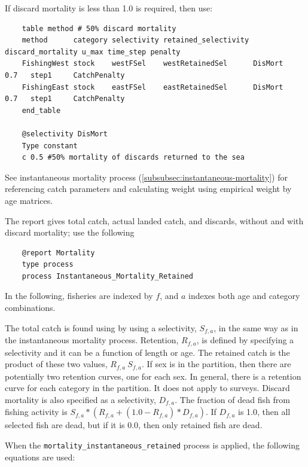 If discard mortality is less than 1.0 is required, then use:

{\small{\begin{verbatim}
    table method # 50% discard mortality
    method      category selectivity retained_selectivity discard_mortality u_max time_step penalty
    FishingWest stock    westFSel    westRetainedSel      DisMort           0.7   step1     CatchPenalty
    FishingEast stock    eastFSel    eastRetainedSel      DisMort           0.7   step1     CatchPenalty
    end_table

    @selectivity DisMort
    Type constant
    c 0.5 #50% mortality of discards returned to the sea
    \end{verbatim}}}

See instantaneous mortality process (\ref{subsubsec:instantaneous-mortality}) for referencing catch parameters and calculating weight using empirical weight by age matrices.

The report gives total catch, actual landed catch, and discards, without and with discard mortality; use the following

{\small{\begin{verbatim}
    @report Mortality
    type process
    process Instantaneous_Mortality_Retained
    \end{verbatim}}}

In the following, fisheries are indexed by $f$, and $a$ indexes both age and category combinations.

The total catch is found using by using a selectivity, $S_{f,a}$, in the same way as in the instantaneous mortality process. Retention, $R_{f,a}$, is defined by specifying a selectivity and it can be a function of length or age. The retained catch is the product of these two values, $R_{f,a} \ S_{f,a}$. If sex is in the partition, then there are potentially two retention curves, one for each sex. In general, there is a retention curve for each category in the partition. It does not apply to surveys. Discard mortality is also specified as a selectivity, $D_{f,a}$. The fraction of dead fish from fishing activity is $S_{f,a} * ( R_{f,a} + (1.0 - R_{f,a} ) * D_{f,a} )$. If $D_{f,a}$ is 1.0, then all selected fish are dead, but if it is 0.0, then only retained fish are dead.

When the \texttt{mortality\_instantaneous\_retained} process is applied, the following equations are used:

